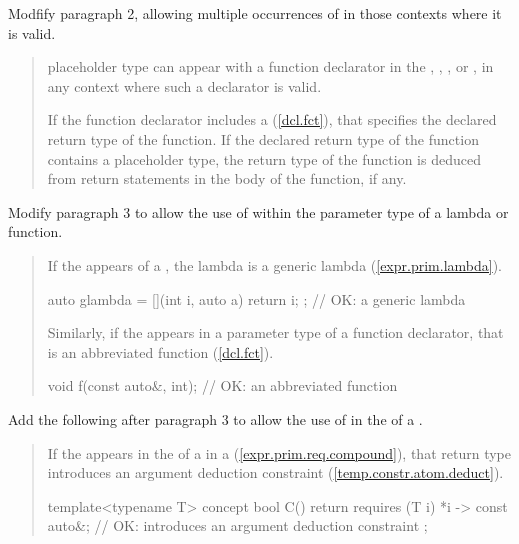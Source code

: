 Modfify paragraph 2, allowing multiple occurrences of 
in those contexts where it is valid.

\begin{quote}
\setcounter{Paras}{1}
\pnum
{} placeholder type can appear with a function 
declarator in the 
, 
,
, or
,
in any context where such a declarator is valid. 

If the function declarator includes a 
(\ref{dcl.fct}),
that specifies the declared return type of the function.
% 
If the declared return type of the function contains a placeholder 
type, the return type of the function is deduced from return 
statements in the body of the function, if any.
\end{quote}

Modify paragraph 3 to allow the use of  within the 
parameter type of a lambda or function.

\begin{quote}
\setcounter{Paras}{2}
\pnum
If the  
appears
of a
, the lambda is
a generic lambda (\ref{expr.prim.lambda}).
% 
\enterexample
\begin{codeblock}
auto glambda = [](int i, auto a) { return i; }; // OK: a generic lambda
\end{codeblock}
\exitexample
% 
\begin{addedblock}
Similarly, if the  
appears in a parameter type of a function declarator, that is an 
abbreviated function (\ref{dcl.fct}).
% 
\enterexample
\begin{codeblock}
void f(const auto&, int); // OK: an abbreviated function
\end{codeblock}
\exitexample
\end{addedblock}
\end{quote}

Add the following after paragraph 3 to allow the use of 
 in the 
 of a 
.

\begin{quote}
\setcounter{Paras}{2}
\pnum
If the   
appears in the  
of a  in
a 
(\ref{expr.prim.req.compound}), that
return type introduces an argument deduction constraint
(\ref{temp.constr.atom.deduct}).
% 
\enterexample
\begin{codeblock}
template<typename T> concept bool C() {
  return requires (T i) { 
    {*i} -> const auto&; // OK: introduces an argument deduction constraint
  };
}
\end{codeblock}
\exitexample
\end{quote}

